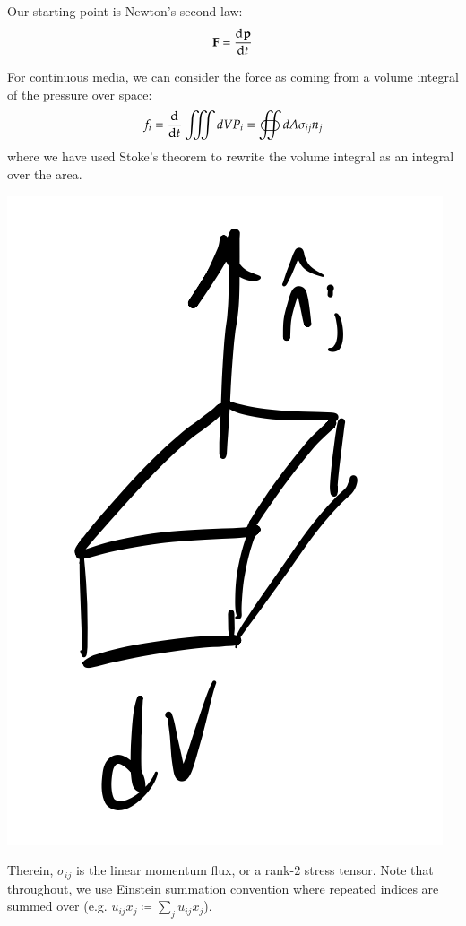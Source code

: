 Our starting point is Newton's second law:
\begin{equation}
    \v{F} = \dod{\v{p}}{t}
\end{equation}

For continuous media, we can consider the force as coming from a volume integral of the pressure over space:
\begin{equation}
    f_i = \dod{}{t}\iiint dV P_i = \oiint dA \sigma_{ij}n_j
\end{equation}
where we have used Stoke's theorem to rewrite the volume integral as an integral over the area. 

\begin{center}
    \includegraphics[scale=0.35]{Lectures/Images/lec1-volelement.png}
\end{center}

Therein, $\sigma_{ij}$ is the linear momentum flux, or a rank-2 stress tensor. Note that throughout, we use Einstein summation convention where repeated indices are summed over (e.g. $u_{ij}x_j \coloneqq \sum_j u_{ij}x_j$).

